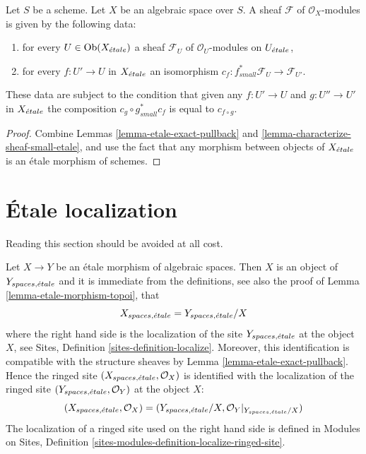 \begin{lemma}
\label{lemma-characterize-module-small-etale}
Let $S$ be a scheme. Let $X$ be an algebraic space over $S$.
A sheaf $\mathcal{F}$ of $\mathcal{O}_X$-modules is given by the following
data:
\begin{enumerate}
\item for every $U \in \mathop{\mathrm{Ob}}\nolimits(X_{\acute{e}tale})$ a sheaf
$\mathcal{F}_U$ of $\mathcal{O}_U$-modules on $U_{\acute{e}tale}$,
\item for every $f : U' \to U$ in $X_{\acute{e}tale}$ an isomorphism
$c_f : f_{small}^*\mathcal{F}_U \to \mathcal{F}_{U'}$.
\end{enumerate}
These data are subject to the condition that given any $f : U' \to U$
and $g : U'' \to U'$ in $X_{\acute{e}tale}$ the composition
$c_g \circ g_{small}^*c_f$ is equal to $c_{f \circ g}$.
\end{lemma}

\begin{proof}
Combine Lemmas \ref{lemma-etale-exact-pullback}
and \ref{lemma-characterize-sheaf-small-etale}, and use the fact that
any morphism between objects of $X_{\acute{e}tale}$ is an \'etale morphism
of schemes.
\end{proof}







\section{\'Etale localization}
\label{section-localize}

\noindent
Reading this section should be avoided at all cost.

\medskip\noindent
Let $X \to Y$ be an \'etale morphism of algebraic spaces.
Then $X$ is an object of $Y_{spaces, {\acute{e}tale}}$ and it is
immediate from the definitions, see also the proof of
Lemma \ref{lemma-etale-morphism-topoi},
that
\begin{equation}
\label{equation-localize}
X_{spaces, {\acute{e}tale}} = Y_{spaces, {\acute{e}tale}}/X
\end{equation}
where the right hand side is the localization of the site
$Y_{spaces, {\acute{e}tale}}$ at the object $X$, see
Sites, Definition \ref{sites-definition-localize}.
Moreover, this identification is compatible with the structure sheaves by
Lemma \ref{lemma-etale-exact-pullback}.
Hence the ringed site $(X_{spaces, {\acute{e}tale}}, \mathcal{O}_X)$
is identified with the localization of the ringed site
$(Y_{spaces, {\acute{e}tale}}, \mathcal{O}_Y)$ at the object $X$:
\begin{equation}
\label{equation-localize-ringed}
(X_{spaces, {\acute{e}tale}}, \mathcal{O}_X) =
(Y_{spaces, {\acute{e}tale}}/X, \mathcal{O}_Y|_{Y_{spaces, {\acute{e}tale}}/X})
\end{equation}
The localization of a ringed site used on the right hand side is defined in
Modules on Sites,
Definition \ref{sites-modules-definition-localize-ringed-site}.

